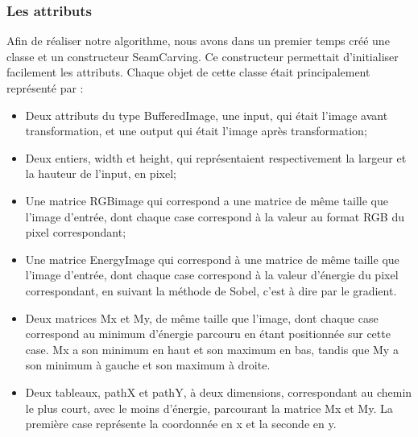 \documentclass[12pt]{article}
\begin{document}
\subsubsection{Les attributs}
Afin de réaliser notre algorithme, nous avons dans un premier temps créé une classe et un constructeur SeamCarving. Ce constructeur permettait d'initialiser facilement les attributs. Chaque objet de cette classe était principalement représenté par :
\begin{itemize}
    \item Deux attributs du type BufferedImage, une input, qui était l'image avant transformation, et une output qui était l'image après transformation;

    \item Deux entiers, width et height, qui représentaient respectivement la largeur et la hauteur de l'input, en pixel;

    \item Une matrice RGBimage qui correspond a une matrice de même taille que l'image d'entrée, dont chaque case correspond à la valeur au format RGB du pixel correspondant;

    \item Une matrice EnergyImage qui correspond à une matrice de même taille que l'image d'entrée, dont chaque case correspond à la valeur d'énergie du pixel correspondant, en suivant la méthode de Sobel, c'est à dire par le gradient.

    \item Deux matrices Mx et My, de même taille que l'image, dont chaque case correspond au minimum d'énergie parcouru en étant positionnée sur cette case. Mx a son minimum en haut et son maximum en bas, tandis que My a son minimum à gauche et son maximum à droite.

    \item Deux tableaux, pathX et pathY, à deux dimensions, correspondant au chemin le plus court, avec le moins d'énergie, parcourant la matrice Mx et My. La première case représente la coordonnée en x et la seconde en y.
\end{itemize}
\end{document}
